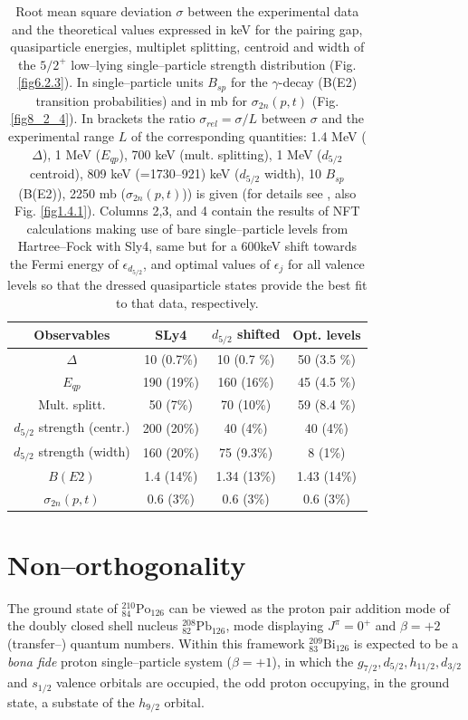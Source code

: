  \begin{table}
\begin{center}
\begin{tabular}{|c|c|c|c|}
\hline
  Observables  &  SLy4 &  $d_{5/2}$ shifted  & Opt. levels \\ 
\hline
$\Delta$ &  10  (0.7\%) &  10  (0.7 \%) & 50   (3.5 \%)\\
 $E_{qp}$ & 190 (19\%)  & 160  (16\%)   & 45  (4.5 \%) \\
 Mult.  splitt. & 50  (7\%) & 70  (10\%)    & 59  (8.4 \%) \\
  $d_{5/2}$ strength (centr.) & 200  (20\%)  & 40  (4\%)   & 40  (4\%) \\
$d_{5/2}$ strength (width) & 160  (20\%)  &75  (9.3\%)  &  8  (1\%) \\
$B(E2)$ & 1.4  (14\%) & 1.34  (13\%)   & 1.43  (14\%) \\ 
$\sigma_{2n}(p,t)$ & 0.6 (3\%) & 0.6 (3\%) & 0.6 (3\%) \\
 \hline
\end{tabular}
\caption{Root  mean square deviation $\sigma$ between  the experimental data and the theoretical values expressed in keV for the pairing gap, quasiparticle energies, multiplet splitting, centroid and width of the  
$5/2^+$ low--lying single--particle strength distribution (Fig. \ref{fig6.2.3}). In single--particle units $B_{sp}$ for the $\gamma$-decay  (B(E2) transition probabilities) and in mb for $\sigma_{2n}(p,t)$ (Fig. \ref{fig8_2_4}). In brackets
the ratio $\sigma_{rel}=\sigma/L$ between $\sigma$ and the experimental  range $L$ of the corresponding quantities: 1.4 MeV ($\Delta$), 1 MeV ($E_{qp}$), 700 keV (mult. splitting), 
1 MeV ($d_{5/2}$ centroid),  809 keV (=1730--921) keV  ($d_{5/2}$ width), 10 $B_{sp}$ (B(E2)), 2250 mb ($\sigma_{2n}(p,t)$)) is given (for details see \cite{Idini:15}, also Fig. \ref{fig1.4.1}). Columns 2,3, and 4 contain the results of NFT calculations making use of bare single--particle levels from Hartree--Fock with Sly4, same but for a 600keV shift towards the Fermi energy of $\epsilon_{d_{5/2}}$, and optimal values of $\epsilon_j$ for all valence levels so that the dressed quasiparticle states provide the best fit to that data, respectively.}
\label{tab1.4.1}
\end{center}
\end{table}


\section{Non--orthogonality}\label{appintroC}
The ground state of $^{210}_{84}\text{Po}_{126}$ can be viewed as the proton pair addition mode of the doubly closed shell nucleus  $^{208}_{82}\text{Pb}_{126}$, mode displaying $J^\pi=0^+$ and $\beta=+2$ (transfer--) quantum numbers. Within this framework $^{209}_{83}\text{Bi}_{126}$ is expected to be a \emph{bona fide} proton single--particle system ($\beta=+1$), in which the $g_{7/2},d_{5/2},h_{11/2},d_{3/2}$ and $s_{1/2}$ valence orbitals are occupied, the odd proton occupying, in the ground state, a substate of the $h_{9/2}$ orbital.



